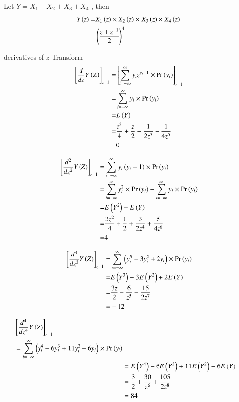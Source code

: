 \documentclass[journal,12pt,twocolumn]{IEEEtran}
\begin{document}
Let $Y=X_1+X_2+X_3+X_4$ , then
\begin{align}
    Y\left(z\right)=& X_1\left(z\right) \times X_2\left(z\right) \times X_3\left(z\right) \times X_4\left(z\right) 
    \\ =& \left(\frac{z+z^{-1}}{2}\right)^4
    \label{eq-z_Transf_Y}
\end{align}

derivatives of $z$ Transform
\begin{align}
    {}\left[\frac{d}{dz}Y\left(Z\right)\right]_{z=1} =& {}\left[ \sum_{i=-\infty}^{\infty} y_i z^{y_i-1}\times \Pr\left(y_i\right)\right]_{z=1}
    \\=&\sum_{i=-\infty}^{\infty} y_i \times \Pr\left(y_i\right)
    \\=&E\left(Y\right)
    \label{eq:d1}
    \\=&\frac{z^{3}}{4} + \frac{z}{2} - \frac{1}{2 z^{3}} - \frac{1}{4 z^{5}}
    \\=&0
\end{align}    
    
\begin{align}
    {}\left[\frac{d^2}{dz^2}Y\left(Z\right)\right]_{z=1} =& \sum_{i=-\infty}^{\infty} y_i\left(y_i-1\right) \times \Pr\left(y_i\right)
    \\=&\sum_{i=-\infty}^{\infty} y_i^2 \times \Pr\left(y_i\right) - \sum_{i=-\infty}^{\infty} y_i \times \Pr\left(y_i\right)
    \\=& E\left(Y^2\right)-E\left(Y\right)
    \label{eq:d2}
    \\=&\frac{3 z^{2}}{4} + \frac{1}{2} + \frac{3}{2 z^{4}} + \frac{5}{4 z^{6}}
    \\=&4
\end{align}    
    
\begin{align}
     {}\left[\frac{d^3}{dz^3}Y\left(Z\right)\right]_{z=1} =& \sum_{i=-\infty}^{\infty} \left(y_i^3-3y_i^2+2y_i\right) \times \Pr\left(y_i\right)
     \\=& E\left(Y^3\right)-3E\left(Y^2\right)+2E\left(Y\right)
     \label{eq:d3}
     \\=&\frac{3 z}{2} - \frac{6}{z^{5}} - \frac{15}{2 z^{7}}
     \\=&-12
\end{align}     
     
\begin{align}
    \begin{split}
         &{}\left[\frac{d^4}{dz^4}Y\left(Z\right)\right]_{z=1}
         \\&=\sum_{i=-\infty}^{\infty} \left(y_i^4-6y_i^3+11y_i^2-6y_i\right) \times \Pr\left(y_i\right)
    \end{split}
    \\&= E\left(Y^4\right)-6E\left(Y^3\right)+11E\left(Y^2\right)-6E\left(Y\right)
    \label{eq:d4}
    \\&=\frac{3}{2} + \frac{30}{z^{6}} + \frac{105}{2 z^{8}}
    \\&=84
\end{align}
\end{document}
